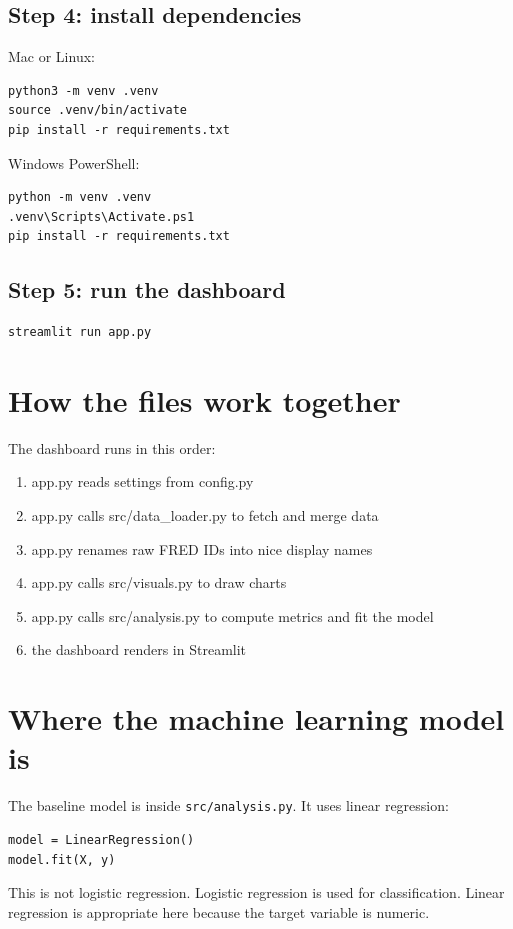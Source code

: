 \documentclass[11pt]{article}
\begin{document}
\subsection{Step 4: install dependencies}
Mac or Linux:
\begin{lstlisting}
python3 -m venv .venv
source .venv/bin/activate
pip install -r requirements.txt
\end{lstlisting}

Windows PowerShell:
\begin{lstlisting}
python -m venv .venv
.venv\Scripts\Activate.ps1
pip install -r requirements.txt
\end{lstlisting}

\subsection{Step 5: run the dashboard}
\begin{lstlisting}
streamlit run app.py
\end{lstlisting}

\section{How the files work together}
The dashboard runs in this order:
\begin{enumerate}[leftmargin=1.5em]
  \item app.py reads settings from config.py
  \item app.py calls src/data\_loader.py to fetch and merge data
  \item app.py renames raw FRED IDs into nice display names
  \item app.py calls src/visuals.py to draw charts
  \item app.py calls src/analysis.py to compute metrics and fit the model
  \item the dashboard renders in Streamlit
\end{enumerate}

\section{Where the machine learning model is}
The baseline model is inside \texttt{src/analysis.py}. It uses linear regression:
\begin{lstlisting}
model = LinearRegression()
model.fit(X, y)
\end{lstlisting}
This is not logistic regression. Logistic regression is used for classification.
Linear regression is appropriate here because the target variable is numeric.
\end{document}
